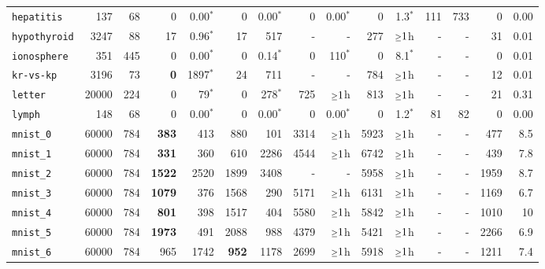 \begin{tabular}{lccrrrrrrrrrrrr}
\texttt{hepatitis} & \multicolumn{1}{r}{137} & \multicolumn{1}{r}{68}  & 0 & 0.00$^*$ & 0 & 0.00$^*$ & 0 & 0.00$^*$ & 0 & 1.3$^*$ & 111 & 733 & 0 & 0.00\\
\texttt{hypothyroid} & \multicolumn{1}{r}{3247} & \multicolumn{1}{r}{88}  & 17 & 0.96$^*$ & 17 & 517 & - & - & 277 & $\mathsmaller{\geq}1$h & - & - & 31 & 0.01\\
\texttt{ionosphere} & \multicolumn{1}{r}{351} & \multicolumn{1}{r}{445}  & 0 & 0.00$^*$ & 0 & 0.14$^*$ & 0 & 110$^*$ & 0 & 8.1$^*$ & - & - & 0 & 0.01\\
\texttt{kr-vs-kp} & \multicolumn{1}{r}{3196} & \multicolumn{1}{r}{73}  & \textbf{0} & 1897$^*$ & 24 & 711 & - & - & 784 & $\mathsmaller{\geq}1$h & - & - & 12 & 0.01\\
\texttt{letter} & \multicolumn{1}{r}{20000} & \multicolumn{1}{r}{224}  & 0 & 79$^*$ & 0 & 278$^*$ & 725 & $\mathsmaller{\geq}1$h & 813 & $\mathsmaller{\geq}1$h & - & - & 21 & 0.31\\
\texttt{lymph} & \multicolumn{1}{r}{148} & \multicolumn{1}{r}{68}  & 0 & 0.00$^*$ & 0 & 0.00$^*$ & 0 & 0.00$^*$ & 0 & 1.2$^*$ & 81 & 82 & 0 & 0.00\\
\texttt{mnist\_0} & \multicolumn{1}{r}{60000} & \multicolumn{1}{r}{784}  & \textbf{383} & 413 & 880 & 101 & 3314 & $\mathsmaller{\geq}1$h & 5923 & $\mathsmaller{\geq}1$h & - & - & 477 & 8.5\\
\texttt{mnist\_1} & \multicolumn{1}{r}{60000} & \multicolumn{1}{r}{784}  & \textbf{331} & 360 & 610 & 2286 & 4544 & $\mathsmaller{\geq}1$h & 6742 & $\mathsmaller{\geq}1$h & - & - & 439 & 7.8\\
\texttt{mnist\_2} & \multicolumn{1}{r}{60000} & \multicolumn{1}{r}{784}  & \textbf{1522} & 2520 & 1899 & 3408 & - & - & 5958 & $\mathsmaller{\geq}1$h & - & - & 1959 & 8.7\\
\texttt{mnist\_3} & \multicolumn{1}{r}{60000} & \multicolumn{1}{r}{784}  & \textbf{1079} & 376 & 1568 & 290 & 5171 & $\mathsmaller{\geq}1$h & 6131 & $\mathsmaller{\geq}1$h & - & - & 1169 & 6.7\\
\texttt{mnist\_4} & \multicolumn{1}{r}{60000} & \multicolumn{1}{r}{784}  & \textbf{801} & 398 & 1517 & 404 & 5580 & $\mathsmaller{\geq}1$h & 5842 & $\mathsmaller{\geq}1$h & - & - & 1010 & 10\\
\texttt{mnist\_5} & \multicolumn{1}{r}{60000} & \multicolumn{1}{r}{784}  & \textbf{1973} & 491 & 2088 & 988 & 4379 & $\mathsmaller{\geq}1$h & 5421 & $\mathsmaller{\geq}1$h & - & - & 2266 & 6.9\\
\texttt{mnist\_6} & \multicolumn{1}{r}{60000} & \multicolumn{1}{r}{784}  & 965 & 1742 & \textbf{952} & 1178 & 2699 & $\mathsmaller{\geq}1$h & 5918 & $\mathsmaller{\geq}1$h & - & - & 1211 & 7.4\\

\end{tabular}
